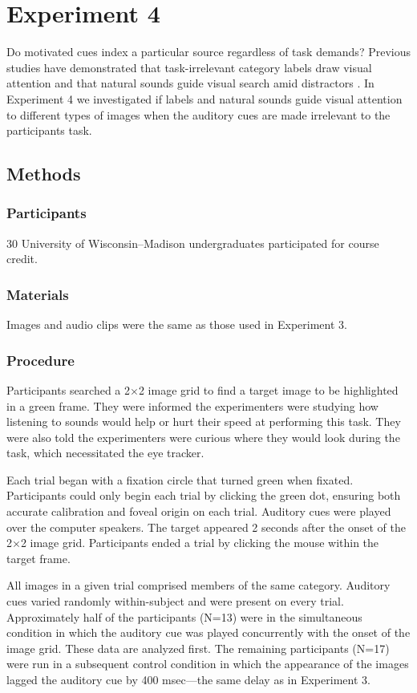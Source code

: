 \documentclass[12pt, titlepage]{article}
\begin{document}
\section{Experiment 4}
Do motivated cues index a particular source regardless of task demands? Previous studies have demonstrated that task-irrelevant category labels draw visual attention \cite{Salverda:2011dx} and that natural sounds guide visual search amid distractors \cite{Iordanescu:2008hm}. In Experiment 4 we investigated if labels and natural sounds guide visual attention to different types of images when the auditory cues are made irrelevant to the participants task.

\subsection{Methods}
\subsubsection*{Participants}
30 University of Wisconsin--Madison undergraduates participated for course credit.

\subsubsection*{Materials}
Images and audio clips were the same as those used in Experiment 3.

\subsubsection*{Procedure}
Participants searched a 2$\times$2 image grid to find a target image to be highlighted in a green frame. They were informed the experimenters were studying how listening to sounds would help or hurt their speed at performing this task. They were also told the experimenters were curious where they would look during the task, which necessitated the eye tracker.

Each trial began with a fixation circle that turned green when fixated. Participants could only begin each trial by clicking the green dot, ensuring both accurate calibration and foveal origin on each trial. Auditory cues were played over the computer speakers. The target appeared 2 seconds after the onset of the 2$\times$2 image grid. Participants ended a trial by clicking the mouse within the target frame.

All images in a given trial comprised members of the same category. Auditory cues varied randomly within-subject and were present on every trial. Approximately half of the participants (N=13) were in the simultaneous condition in which the auditory cue was played concurrently with the onset of the image grid. These data are analyzed first. The remaining participants (N=17) were run in a subsequent control condition in which the appearance of the images lagged the auditory cue by 400 msec---the same delay as in Experiment 3.
\end{document}
